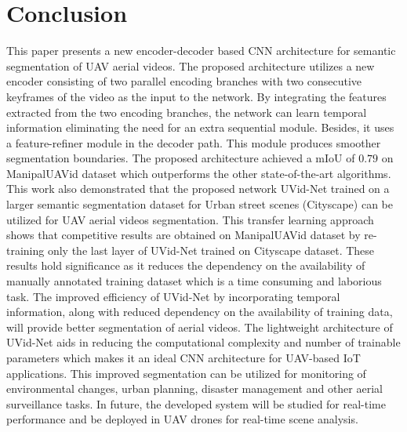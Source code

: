 \documentclass[journal]{IEEEtran}
\begin{document}
\section{Conclusion}
\par This paper presents a new encoder-decoder based CNN architecture for semantic segmentation of UAV aerial videos. The proposed architecture utilizes a new encoder consisting of two parallel encoding branches with two consecutive keyframes of the video as the input to the network. By integrating the features extracted from the two encoding branches, the network can learn temporal information eliminating the need for an extra sequential module. Besides, it uses a feature-refiner module in the decoder path. This module produces smoother segmentation boundaries. The proposed architecture achieved a mIoU of $0.79$ on ManipalUAVid dataset which outperforms the other state-of-the-art algorithms. 
This work also demonstrated that the proposed network UVid-Net trained on a larger semantic segmentation dataset for Urban street scenes (Cityscape) can be utilized for UAV aerial videos segmentation. This transfer learning approach shows that competitive results are obtained on ManipalUAVid dataset by re-training only the last layer of UVid-Net trained on Cityscape dataset.  These results hold significance as it reduces the dependency on the availability of manually annotated training dataset which is a time consuming and laborious task. 
The improved efficiency of UVid-Net by incorporating temporal information, along with reduced dependency on the availability of training data, will provide better segmentation of aerial videos. The lightweight architecture of UVid-Net aids in reducing the computational complexity and number of trainable parameters which makes it an ideal CNN architecture for UAV-based IoT applications. This improved segmentation can be utilized for monitoring of environmental changes, urban planning, disaster management and other aerial surveillance tasks.  In future, the developed system will be studied for real-time performance and be deployed in UAV drones for real-time scene analysis. 
\end{document}
